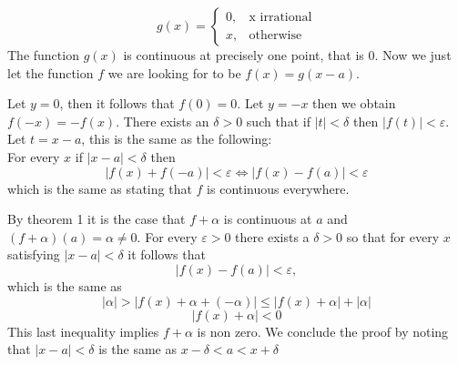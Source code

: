 \begin{problem}
	\[g(x)=
	\begin{cases}
		0, &\text{x irrational}\\
		x, &\text{otherwise}
	\end{cases}
	\]
	The function $g(x)$ is continuous at precisely one point, that is 0. Now we just let the function $f$ we are looking for to be $f(x)=g(x-a)$.
\end{problem}

\begin{problem}
\end{problem}

\begin{problem}
	Let $y=0$, then it follows that $f(0)=0$. Let $y=-x$ then we obtain $f(-x)=-f(x)$. There exists an $\delta>0$ such that if $|t|<\delta$ then $|f(t)|<\varepsilon$. Let $t=x-a$, this is the same as the following:\\
	For every $x$ if $|x-a|<\delta$ then $$|f(x)+f(-a)|<\varepsilon\iff |f(x)-f(a)|<\varepsilon$$ which is the same as stating that $f$ is continuous everywhere.
\end{problem}

\begin{problem}
	By theorem 1 it is the case that $f+\alpha$ is continuous at $a$ and $(f+\alpha)(a)=\alpha\neq0$. For every $\varepsilon>0$ there exists a $\delta>0$ so that for every $x$ satisfying $|x-a|<\delta$ it follows that $$|f(x)-f(a)|<\varepsilon,$$ which is the same as
	$$|\alpha|>|f(x)+\alpha+(-\alpha)|\leq|f(x)+\alpha|+|\alpha|$$
	$$|f(x)+\alpha|<0$$
	This last inequality implies $f+\alpha$ is non zero. We conclude the proof by noting that $|x-a|<\delta$ is the same as $x-\delta<a<x+\delta$
\end{problem}

\begin{problem}
\end{problem}

